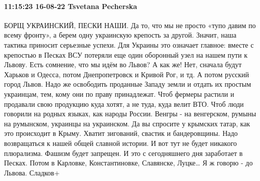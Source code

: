  
 
 
 
 

\paragraph{11:15:23 16-08-22 Tsvetana Pecherska}

\obeycr
БОРЩ УКРАИНСКИЙ, ПЕСКИ НАШИ.
Да то, что мы не просто «тупо давим по всему фронту», а берем одну украинскую крепость за другой. Значит, наша тактика приносит серьезные успехи.
Для Украины это означает главное: вместе с крепостью в Песках ВСУ потеряли еще один оборонный узел на нашем пути к Львову.
Есть сомнение, что мы идём во Львов? А как же!
Нет, сначала будут Харьков и Одесса, потом Днепропетровск и Кривой Рог, и тд. А потом русский город Львов.
Надо же освободить проданные Западу земли и отдать их простым украинцам, тем, кому они по праву принадлежат. Чтоб фермеры растили и продавали свою продукцию куда хотят, а не туда, куда велит ВТО.
Чтоб люди говорили на родных языках, как народы России. Венгры - на венгерском, румыны на румынском, украинцы на украинском. Да вы спросите у крымских татар, как это происходит в Крыму.
Хватит зигований, свастик и бандеровщины. Надо возвращаться к нашей общей славной истории. И вот тут не будет никакого плюрализма. Фашизм будет запрещен.
И это с сегодняшнего дня заработает в Песках. Потом в Карловке, Константиновке, Славянске, Луцке… Я ж говорю - до Львова.
Сладков+
\restorecr

